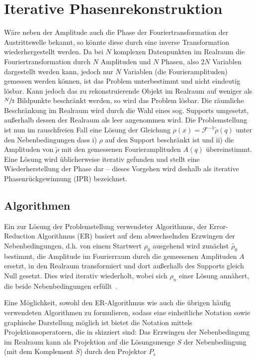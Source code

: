 \section{Iterative Phasenrekonstruktion}
Wäre neben der Amplitude auch die Phase der Fouriertransformation der Austrittswelle bekannt, so könnte diese durch eine inverse Transformation wiederhergestellt werden. 
Da bei $N$ komplexen Datenpunkten im Realraum die Fouriertransformation durch $N$ Amplituden und $N$ Phasen, also $2N$ Variablen dargestellt werden kann, jedoch nur $N$ Variablen (die Fourieramplituden) gemessen werden können, ist das Problem unterbestimmt und nicht eindeutig lösbar. Kann jedoch das zu rekonstruierende Objekt im Realraum auf weniger als $\sfrac{N}{2}$ Bildpunkte beschränkt werden, so wird das Problem lösbar. Die räumliche Beschränkung im Realraum wird durch die Wahl eines sog. Supports umgesetzt, außerhalb dessen der Realraum als leer angenommen wird.  
Die Problemstellung ist nun im rauschfreien Fall eine Lösung der Gleichung $\rho(x)=\mathscr{F}^{-1}\tilde{\rho}(q)$ unter den Nebenbedingungen dass i) $\rho$ auf den Support beschränkt ist und ii) die Amplituden von $\tilde{\rho}$ mit den gemessenen Fourieramplituden $A(q)$ übereinstimmt. Eine Lösung wird üblicherweise iterativ gefunden und stellt eine Wiederherstellung der Phase dar -- dieses Vorgehen wird deshalb als iterative Phasenrückgewinnung (IPR) bezeichnet.
\subsection{Algorithmen}
Ein zur Lösung der Problemstellung verwendeter Algorithmus, der Error-Reduction Algorithmus (ER) basiert auf dem abwechselnden Erzwingen der Nebenbedingungen, d.h. von einem Startwert $\rho_0$ ausgehend wird zunächst $\tilde{\rho_0}$ bestimmt, die Amplitude im Fourierraum durch die gemessenen Amplituden $A$ ersetzt, in den Realraum transformiert und dort außerhalb des Supports gleich Null gesetzt. Dies wird iterativ wiederholt, wobei sich $\rho_n$ einer Lösung annähert, die beide Nebenbedingungen erfüllt~\cite{fienup1978}.

Eine Möglichkeit, sowohl den ER-Algorithmus wie auch die übrigen häufig verwendeten Algorithmen zu formulieren, sodass eine einheitliche Notation sowie graphische Darstellung möglich ist bietet die Notation mittels Projektionsoperatoren, die in  skizziert sind:
Das Erzwingen der Nebenbedingung im Realraum kann als Projektion auf die Lösungsmenge $S$ der Nebenbedingung  (mit dem Komplement $\bar{S}$) durch den Projektor $P_s$ 

